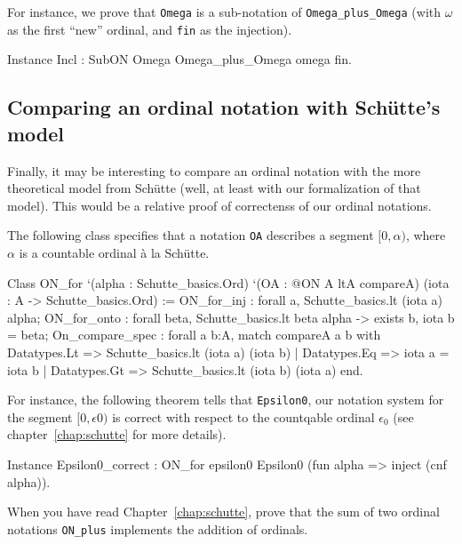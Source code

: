 For instance, we prove that \texttt{Omega} is a sub-notation of
\texttt{Omega\_plus\_Omega} (with $\omega$ as the first ``new'' ordinal, and \texttt{fin} as the injection).

\begin{Coqsrc}
Instance Incl : SubON Omega Omega_plus_Omega omega fin.
\end{Coqsrc}




\subsection{Comparing an ordinal notation with Schütte's model}

Finally, it may be interesting to compare an ordinal notation with the more theoretical model from Schütte (well, at least with our formalization of that model). This would be a relative proof of correctenss of our ordinal  notations.

The following class specifies that a notation \texttt{OA} describes a segment $[0,\alpha)$,
where $\alpha$ is a countable ordinal à la Schütte.

\begin{Coqsrc}
Class ON_for `(alpha : Schutte_basics.Ord)
     `(OA : @ON A ltA  compareA)
      (iota : A -> Schutte_basics.Ord) :=
  { ON_for_inj : forall a, Schutte_basics.lt (iota a) alpha;
    ON_for_onto : forall beta, Schutte_basics.lt beta alpha ->
                                exists b, iota b = beta;
    On_compare_spec : forall a b:A,
        match compareA a b with
          Datatypes.Lt => Schutte_basics.lt (iota a) (iota b)
        | Datatypes.Eq => iota a = iota b
        | Datatypes.Gt => Schutte_basics.lt (iota b) (iota a)
        end}.
\end{Coqsrc}



For instance, the following theorem tells that \texttt{Epsilon0}, our notation system for the segment $[0,\epsilon0)$ is correct with respect to the countqable ordinal $\epsilon_0$
(see chapter~\ref{chap:schutte} for more details).


\begin{Coqsrc}
Instance Epsilon0_correct :
  ON_for epsilon0 Epsilon0  (fun alpha => inject (cnf alpha)).
\end{Coqsrc}


\begin{project}
  When you have read Chapter~\ref{chap:schutte}, prove that the sum of two ordinal notations \texttt{ON\_plus} implements the addition of ordinals.
\end{project}


